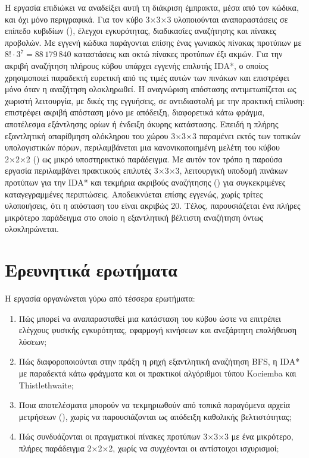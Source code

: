 Η εργασία επιδιώκει να αναδείξει αυτή τη διάκριση έμπρακτα, μέσα από τον κώδικα, και όχι μόνο περιγραφικά. Για τον κύβο 3×3×3 υλοποιούνται αναπαραστάσεις σε επίπεδο κυβιδίων (), έλεγχοι εγκυρότητας, διαδικασίες αναζήτησης και πίνακες προβολών. Με εγγενή κώδικα παράγονται επίσης ένας γωνιακός πίνακας προτύπων με $8!\cdot3^7 = 88\,179\,840$ καταστάσεις και οκτώ πίνακες προτύπων έξι ακμών. Για την ακριβή αναζήτηση πλήρους κύβου υπάρχει εγγενής επιλυτής IDA*, ο οποίος χρησιμοποιεί παραδεκτή ευρετική από τις τιμές αυτών των πινάκων και επιστρέφει  μόνο όταν η αναζήτηση ολοκληρωθεί. Η αναγνώριση απόστασης αντιμετωπίζεται ως χωριστή λειτουργία, με δικές της εγγυήσεις, σε αντιδιαστολή με την πρακτική επίλυση: επιστρέφει ακριβή απόσταση μόνο με απόδειξη, διαφορετικά κάτω φράγμα, αποτέλεσμα εξάντλησης ορίων ή ένδειξη άκυρης κατάστασης. Επειδή η πλήρης εξαντλητική απαρίθμηση ολόκληρου του χώρου 3×3×3 παραμένει εκτός των τοπικών υπολογιστικών πόρων, περιλαμβάνεται μια κανονικοποιημένη μελέτη του κύβου 2×2×2 () ως μικρό υποστηρικτικό παράδειγμα. Με αυτόν τον τρόπο η παρούσα εργασία περιλαμβάνει πρακτικούς επιλυτές 3×3×3, λειτουργική υποδομή πινάκων προτύπων για την IDA* και τεκμήρια ακριβούς αναζήτησης () για συγκεκριμένες καταγεγραμμένες περιπτώσεις. Αποδεικνύεται επίσης εγγενώς, χωρίς τρίτες υλοποιήσεις, ότι η απόσταση του  είναι ακριβώς 20. Τέλος, παρουσιάζεται ένα πλήρες μικρότερο παράδειγμα στο οποίο η εξαντλητική βέλτιστη αναζήτηση όντως ολοκληρώνεται.

\section{Ερευνητικά ερωτήματα}\label{sec:intro-questions}
Η εργασία οργανώνεται γύρω από τέσσερα ερωτήματα:

\begin{enumerate}
\item Πώς μπορεί να αναπαρασταθεί μια κατάσταση του κύβου ώστε να επιτρέπει ελέγχους φυσικής εγκυρότητας, εφαρμογή κινήσεων και ανεξάρτητη επαλήθευση λύσεων;
\item Πώς διαφοροποιούνται στην πράξη η ρηχή εξαντλητική αναζήτηση BFS, η IDA* με παραδεκτά κάτω φράγματα και οι πρακτικοί αλγόριθμοι τύπου Kociemba και Thistlethwaite;
\item Ποια αποτελέσματα μπορούν να τεκμηριωθούν από τοπικά παραγόμενα αρχεία μετρήσεων (), χωρίς να παρουσιάζονται ως απόδειξη καθολικής βελτιστότητας;
\item Πώς συνδυάζονται οι πραγματικοί πίνακες προτύπων 3×3×3 με ένα μικρότερο, πλήρες παράδειγμα 2×2×2, χωρίς να συγχέονται οι αντίστοιχοι ισχυρισμοί;
\end{enumerate}

